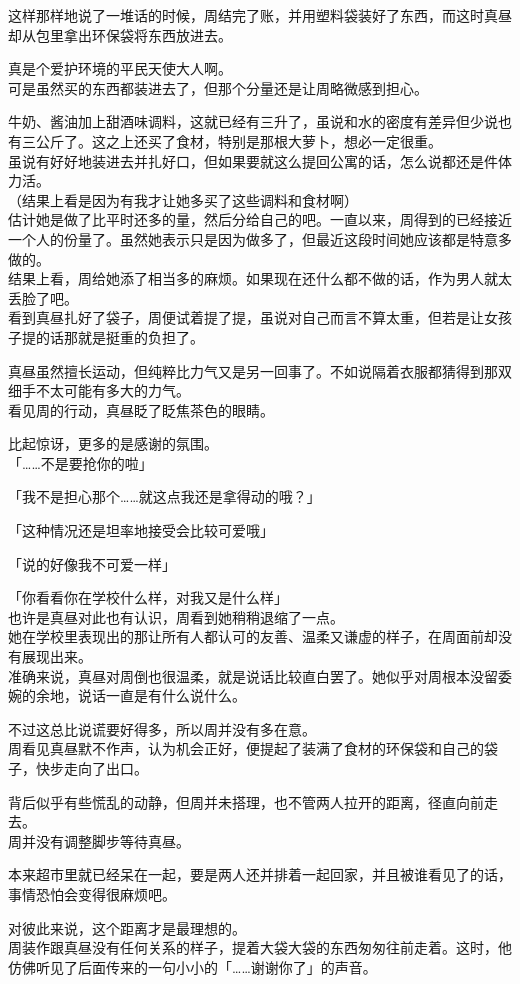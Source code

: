 这样那样地说了一堆话的时候，周结完了账，并用塑料袋装好了东西，而这时真昼却从包里拿出环保袋将东西放进去。

真是个爱护环境的平民天使大人啊。\\

可是虽然买的东西都装进去了，但那个分量还是让周略微感到担心。

牛奶、酱油加上甜酒味调料，这就已经有三升了，虽说和水的密度有差异但少说也有三公斤了。这之上还买了食材，特别是那根大萝卜，想必一定很重。\\

虽说有好好地装进去并扎好口，但如果要就这么提回公寓的话，怎么说都还是件体力活。\\

（结果上看是因为有我才让她多买了这些调料和食材啊）\\

估计她是做了比平时还多的量，然后分给自己的吧。一直以来，周得到的已经接近一个人的份量了。虽然她表示只是因为做多了，但最近这段时间她应该都是特意多做的。\\

结果上看，周给她添了相当多的麻烦。如果现在还什么都不做的话，作为男人就太丢脸了吧。\\

看到真昼扎好了袋子，周便试着提了提，虽说对自己而言不算太重，但若是让女孩子提的话那就是挺重的负担了。

真昼虽然擅长运动，但纯粹比力气又是另一回事了。不如说隔着衣服都猜得到那双细手不太可能有多大的力气。\\

看见周的行动，真昼眨了眨焦茶色的眼睛。

比起惊讶，更多的是感谢的氛围。\\

「……不是要抢你的啦」

「我不是担心那个……就这点我还是拿得动的哦？」

「这种情况还是坦率地接受会比较可爱哦」

「说的好像我不可爱一样」

「你看看你在学校什么样，对我又是什么样」\\

也许是真昼对此也有认识，周看到她稍稍退缩了一点。\\

她在学校里表现出的那让所有人都认可的友善、温柔又谦虚的样子，在周面前却没有展现出来。\\

准确来说，真昼对周倒也很温柔，就是说话比较直白罢了。她似乎对周根本没留委婉的余地，说话一直是有什么说什么。

不过这总比说谎要好得多，所以周并没有多在意。\\

周看见真昼默不作声，认为机会正好，便提起了装满了食材的环保袋和自己的袋子，快步走向了出口。

背后似乎有些慌乱的动静，但周并未搭理，也不管两人拉开的距离，径直向前走去。\\

周并没有调整脚步等待真昼。

本来超市里就已经呆在一起，要是两人还并排着一起回家，并且被谁看见了的话，事情恐怕会变得很麻烦吧。

对彼此来说，这个距离才是最理想的。\\

周装作跟真昼没有任何关系的样子，提着大袋大袋的东西匆匆往前走着。这时，他仿佛听见了后面传来的一句小小的「……谢谢你了」的声音。
